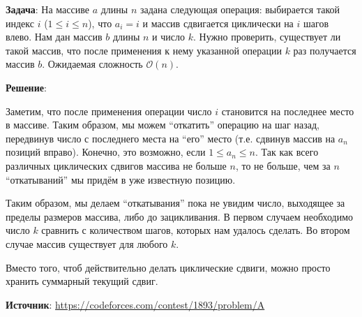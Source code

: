 \documentclass{article} %
\begin{document}
\textbf{Задача}: На массиве $a$ длины $n$ задана следующая операция: выбирается такой индекс $i$ ($1 \leqslant i \leqslant n$), что $a_i = i$ и массив сдвигается циклически на $i$ шагов влево. Нам дан массив $b$ длины $n$ и число $k$. Нужно проверить, существует ли такой массив, что после применения к нему указанной операции $k$ раз получается массив $b$. Ожидаемая сложность $\mathcal{O}(n)$.

\clearpage

\textbf{Решение}: 

Заметим, что после применения операции число $i$ становится на последнее место в массиве. Таким образом, мы можем ``откатить'' операцию на шаг назад, передвинув число с последнего места на ``его'' место (т.е. сдвинув массив на $a_n$ позиций вправо). Конечно, это возможно, если $1 \leqslant a_n \leqslant n$. Так как всего различных циклических сдвигов массива не больше $n$, то не больше, чем за $n$ ``откатываний'' мы придём в уже известную позицию.

Таким образом, мы делаем ``откатывания'' пока не увидим число, выходящее за пределы размеров массива, либо до зацикливания. В первом случаем необходимо число $k$ сравнить с количеством шагов, которых нам удалось сделать. Во втором случае массив существует для любого $k$.

Вместо того, чтоб действительно делать циклические сдвиги, можно просто хранить суммарный текущий сдвиг.



\textbf{Источник}: \url{https://codeforces.com/contest/1893/problem/A}
\end{document}
